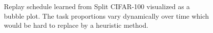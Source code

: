 
\begin{figure}[t]
  \centering
  \setlength{\figwidth}{0.46\textwidth}
  \setlength{\figheight}{.22\textheight}
  
  \vspace{-4mm}
  \caption{ Replay schedule learned from Split CIFAR-100 visualized as a bubble plot. %
  The task proportions vary dynamically over time which would be hard to replace by a heuristic method. 
  } 
  \vspace{-5mm}
  \label{fig:replay_schedule_vis_cifar100}
\end{figure}